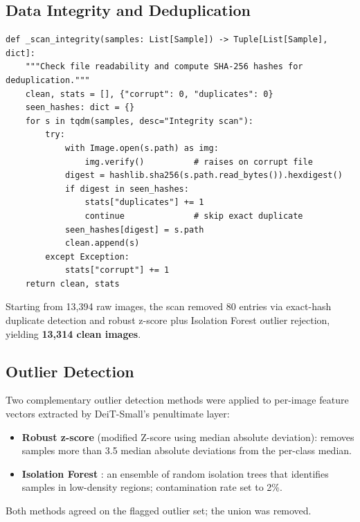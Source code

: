 \documentclass[12pt,a4paper]{article}
\begin{document}
\subsection{Data Integrity and Deduplication}

\begin{lstlisting}[caption={File integrity scan and SHA-256 deduplication (excerpt from \texttt{00\_eda\_preprocess.py}).},label={lst:dedup}]
def _scan_integrity(samples: List[Sample]) -> Tuple[List[Sample], dict]:
    """Check file readability and compute SHA-256 hashes for deduplication."""
    clean, stats = [], {"corrupt": 0, "duplicates": 0}
    seen_hashes: dict = {}
    for s in tqdm(samples, desc="Integrity scan"):
        try:
            with Image.open(s.path) as img:
                img.verify()          # raises on corrupt file
            digest = hashlib.sha256(s.path.read_bytes()).hexdigest()
            if digest in seen_hashes:
                stats["duplicates"] += 1
                continue              # skip exact duplicate
            seen_hashes[digest] = s.path
            clean.append(s)
        except Exception:
            stats["corrupt"] += 1
    return clean, stats
\end{lstlisting}

Starting from 13,394 raw images, the scan removed 80 entries via exact-hash duplicate detection and robust z-score plus Isolation Forest outlier rejection, yielding \textbf{13,314 clean images}.

\subsection{Outlier Detection}

Two complementary outlier detection methods were applied to per-image feature vectors extracted by DeiT-Small's penultimate layer:

\begin{itemize}
\item \textbf{Robust z-score} (modified Z-score using median absolute deviation): removes samples more than 3.5 median absolute deviations from the per-class median.
\item \textbf{Isolation Forest} \cite{liu2008isolation}: an ensemble of random isolation trees that identifies samples in low-density regions; contamination rate set to 2\%.
\end{itemize}

Both methods agreed on the flagged outlier set; the union was removed.
\end{document}
